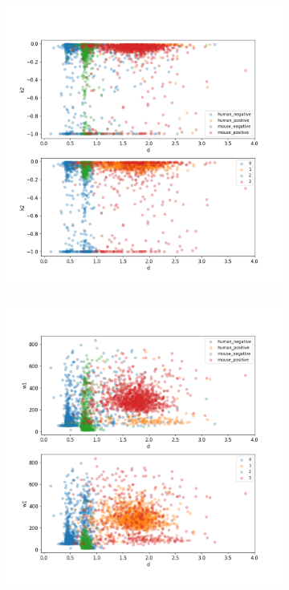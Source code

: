 \begin{figure}
	\begin{subfigure}{0.45\textwidth}
		\includegraphics[width=\textwidth]{fig/seperate_d_k2}
	\end{subfigure}
	\hfill
	\begin{subfigure}{0.45\textwidth}
		\includegraphics[width=\textwidth]{fig/seperate_d_w1}

\end{subfigure}
\end{figure}
